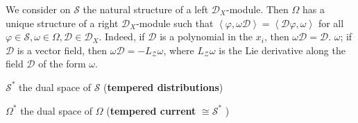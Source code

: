 \documentclass[11pt]{article}
\theoremstyle{plain}
\theoremstyle{definition}
\theoremstyle{remark}
\begin{document}
We consider on $\mathcal{S}$ the natural structure of a left $\mathcal{D}_X$-module.
Then $\Omega$ has a unique structure of a right $\mathcal{D}_{X}$-module such that $\left\langle \varphi, \omega \mathscr{D} \right\rangle =\left\langle \mathscr{D} \varphi, \omega \right\rangle$ for all $\varphi \in \mathcal{S}, \omega \in \Omega, \mathscr{D} \in \mathcal{D}_X$.
Indeed, if $\mathscr{D}$ is a polynomial in the $x_i$, then $\omega \mathscr{D}=\mathscr{D}$. $\omega$; if $\mathscr{D}$ is a vector field, then $\omega \mathscr{D}=-L_{\mathscr{Z}} \omega$, where $L_{\mathscr{Z}} \omega$ is the Lie derivative along the field $\mathscr{D}$ of the form $\omega$.


$\mathcal{S}^*$ the dual space of $\mathcal{S}$ (\textbf{tempered distributions})




$\Omega^*$ the dual space of $\Omega$ (\textbf{tempered current} $\cong \mathcal{S}^*$ )
\end{document}
